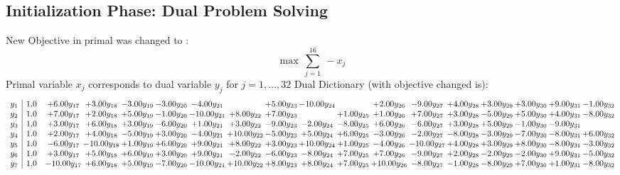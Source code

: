 \documentclass[9pt]{article}
\begin{document}
\subsection{Initialization Phase: Dual Problem Solving}
New Objective in primal was changed to : \[ \max\ \sum_{j=1}^{16}\ - x_j \] 
Primal variable $x_j$ corresponds to dual variable $y_j$ for $j = 1,\ldots,32$
Dual Dictionary (with objective changed is): 
\[\begin{array}{c| c c@{\hskip 2pt} c@{\hskip 2pt} c@{\hskip 2pt} c@{\hskip 2pt} c@{\hskip 2pt} c@{\hskip 2pt} c@{\hskip 2pt} c@{\hskip 2pt} c@{\hskip 2pt} c@{\hskip 2pt} c@{\hskip 2pt} c@{\hskip 2pt} c@{\hskip 2pt} c@{\hskip 2pt} c@{\hskip 2pt} c@{\hskip 2pt} }
 y_{1}   &  1.0 & +  6.00 y_{17} & +  3.00 y_{18} & -3.00 y_{19} & -3.00 y_{20} & -4.00 y_{21} &   & +  5.00 y_{23} & -10.00 y_{24} &   & +  2.00 y_{26} & -9.00 y_{27} & +  4.00 y_{28} & +  3.00 y_{29} & +  3.00 y_{30} & +  9.00 y_{31} & -1.00 y_{32}\\
 y_{2}   &  1.0 & +  7.00 y_{17} & +  2.00 y_{18} & +  5.00 y_{19} & -1.00 y_{20} & -10.00 y_{21} & +  8.00 y_{22} & +  7.00 y_{23} &   & +  1.00 y_{25} & +  1.00 y_{26} & +  7.00 y_{27} & +  3.00 y_{28} & -5.00 y_{29} & +  5.00 y_{30} & +  4.00 y_{31} & -8.00 y_{32}\\
 y_{3}   &  1.0 & +  3.00 y_{17} & +  6.00 y_{18} & +  3.00 y_{19} & -6.00 y_{20} & +  1.00 y_{21} & +  3.00 y_{22} & -9.00 y_{23} & -2.00 y_{24} & -8.00 y_{25} & +  6.00 y_{26} & -6.00 y_{27} & +  3.00 y_{28} & +  5.00 y_{29} & -1.00 y_{30} & -9.00 y_{31} &   \\
 y_{4}   &  1.0 & +  2.00 y_{17} & +  4.00 y_{18} & -5.00 y_{19} & +  3.00 y_{20} & -4.00 y_{21} & + 10.00 y_{22} & -5.00 y_{23} & +  5.00 y_{24} & +  6.00 y_{25} & -3.00 y_{26} & -2.00 y_{27} & -8.00 y_{28} & -3.00 y_{29} & -7.00 y_{30} & -8.00 y_{31} & +  6.00 y_{32}\\
 y_{5}   &  1.0 & -6.00 y_{17} & -10.00 y_{18} & +  1.00 y_{19} & +  6.00 y_{20} & +  9.00 y_{21} & +  8.00 y_{22} & +  3.00 y_{23} & + 10.00 y_{24} & +  1.00 y_{25} & -4.00 y_{26} & -10.00 y_{27} & +  4.00 y_{28} & +  3.00 y_{29} & +  8.00 y_{30} & -8.00 y_{31} & -3.00 y_{32}\\
 y_{6}   &  1.0 & +  3.00 y_{17} & +  5.00 y_{18} & +  6.00 y_{19} & +  3.00 y_{20} & +  9.00 y_{21} & -2.00 y_{22} & -6.00 y_{23} & -8.00 y_{24} & +  7.00 y_{25} & +  7.00 y_{26} & -9.00 y_{27} & +  2.00 y_{28} & -2.00 y_{29} & -2.00 y_{30} & +  9.00 y_{31} & -5.00 y_{32}\\
 y_{7}   &  1.0 & -10.00 y_{17} & +  6.00 y_{18} & +  5.00 y_{19} & -7.00 y_{20} & -10.00 y_{21} & + 10.00 y_{22} & +  8.00 y_{23} & +  8.00 y_{24} & +  7.00 y_{25} & + 10.00 y_{26} & -8.00 y_{27} & -1.00 y_{28} & -8.00 y_{29} & +  7.00 y_{30} & +  1.00 y_{31} & -8.00 y_{32}\\

\end{array}\]
\end{document}
